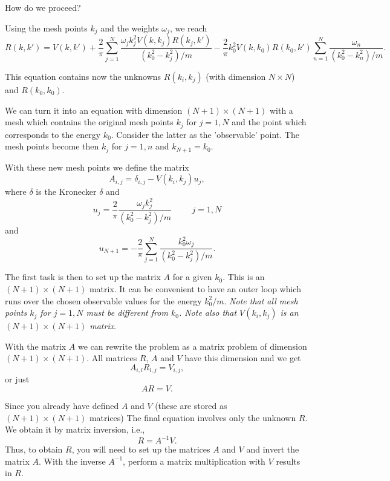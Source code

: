 \documentclass[%
oneside,                 %
final,                   %
10pt]{article}
\begin{document}
How do we proceed?

Using the mesh points $k_j$ and the weights $\omega_j$,
         we reach
\[
          R(k,k') = V(k,k') +\frac{2}{\pi}
          \sum_{j=1}^N\frac{\omega_jk_j^2V(k,k_j)R(k_j,k')}
                           {(k_0^2-k_j^2)/m}
           -\frac{2}{\pi}k_0^2V(k,k_0)R(k_0,k')
          \sum_{n=1}^N\frac{\omega_n}
                           {(k_0^2-k_n^2)/m}.                
\]

This equation contains now the unknowns $R(k_i,k_j)$
(with dimension $N\times N$) and $R(k_0,k_0)$.

We can turn it into an equation
with dimension $(N+1)\times (N+1)$ with  a mesh
which contains the original mesh points $k_j$ for $j=1,N$
and the point which corresponds to the energy $k_0$.
Consider the latter as the 'observable' point.
The mesh points become then $k_j$ for $j=1,n$ and
$k_{N+1}=k_0$. 

With these new mesh points we define the matrix
\begin{equation}
      A_{i,j}=\delta_{i,j}-V(k_i,k_j)u_j,
      \label{eq:aeq}
\end{equation}
where $\delta$ is the Kronecker $\delta$
and
\[
     u_j=\frac{2}{\pi}\frac{\omega_jk_j^2}{(k_0^2-k_j^2)/m}\hspace{1cm} j=1,N
\]
and
\[
     u_{N+1}=-\frac{2}{\pi}\sum_{j=1}^N\frac{k_0^2\omega_j}{(k_0^2-k_j^2)/m}.
\]

The first task is then to 
set up the matrix $A$ for a given $k_0$. This is an
$(N+1)\times (N+1)$ matrix. It can be convenient
to have an outer loop which runs over the chosen
observable values for the energy $k_0^2/m$.
{\em Note that all mesh points $k_j$ for $j=1,N$ must be
different from $k_0$. Note also that
$V(k_i,k_j)$ is an
$(N+1)\times (N+1)$ matrix}. 

With the matrix $A$ we can rewrite the problem as a matrix problem of dimension $(N+1)\times (N+1)$.
All matrices $R$, $A$ and $V$ have this dimension and we get
\[
    A_{i,l}R_{l,j}=V_{i,j},
\] 
or just
\[
    AR=V.
\] 

Since you already have defined $A$ and $V$
(these are stored as $(N+1)\times (N+1)$ matrices) 
The final equation involves only the unknown
$R$. We obtain it by matrix inversion, i.e.,
\begin{equation}
    R=A^{-1}V.
    \label{eq:final2}
\end{equation}
Thus, to obtain $R$, you will need to set up the matrices
$A$ and $V$ and invert the matrix $A$. 
With the inverse $A^{-1}$, perform
a matrix multiplication with $V$ results in $R$.
\end{document}
